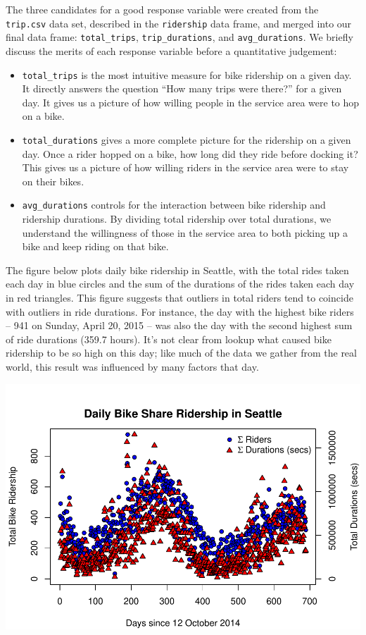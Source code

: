 \documentclass[
]{article}
\begin{document}
The three candidates for a good response variable were created from the
\texttt{trip.csv} data set, described in the \texttt{ridership} data
frame, and merged into our final data frame: \texttt{total\_trips},
\texttt{trip\_durations}, and \texttt{avg\_durations}. We briefly
discuss the merits of each response variable before a quantitative
judgement:

\begin{itemize}
\item \texttt{total\_trips} is the most intuitive measure for bike ridership on a given day. It directly answers the question ``How many trips were there?'' for a given day. It gives us a picture of how willing people in the service area were to hop on a bike.
\item \texttt{total\_durations} gives a more complete picture for the ridership on a given day. Once a rider hopped on a bike, how long did they ride before docking it? This gives us a picture of how willing riders in the service area were to stay on their bikes.
\item \texttt{avg\_durations} controls for the interaction between bike ridership and ridership durations. By dividing total ridership over total durations, we understand the willingness of those in the service area to both picking up a bike and keep riding on that bike.
\end{itemize}

The figure below plots daily bike ridership in Seattle, with the total
rides taken each day in blue circles and the sum of the durations of the
rides taken each day in red triangles. This figure suggests that
outliers in total riders tend to coincide with outliers in ride
durations. For instance, the day with the highest bike riders -- 941 on
Sunday, April 20, 2015 -- was also the day with the second highest sum
of ride durations (359.7 hours). It's not clear from lookup what caused
bike ridership to be so high on this day; like much of the data we
gather from the real world, this result was influenced by many factors
that day.

\includegraphics{MATH361_Rough_Draft_files/figure-latex/plot_y-1.pdf}
\end{document}
